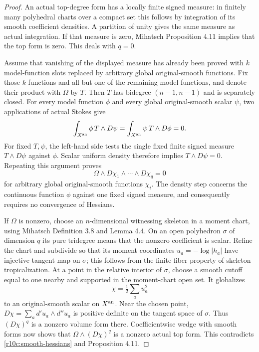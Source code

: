\begin{proof}
An actual top-degree form has a locally finite signed measure: in finitely
many polyhedral charts over a compact set this follows by integration of
its smooth coefficient densities.  A partition of unity gives the same
measure as actual integration.  If that measure is zero, Mihatsch
Proposition 4.11 implies that the top form is zero.  This deals with $q=0$.

Assume that vanishing of the displayed measure has already been proved
with $k$ model-function slots replaced by arbitrary global original-smooth
functions.  Fix those $k$ functions and all but one of the remaining
model functions, and denote their product with $\Omega$ by $T$.
Then $T$ has bidegree $(n-1,n-1)$ and is separately closed.  For every
model function $\phi$ and every global original-smooth scalar $\psi$,
two applications of actual Stokes give
\[
 \int_{X^{\rm an}}\phi\,T\wedge D\psi
     =\int_{X^{\rm an}}\psi\,T\wedge D\phi=0.
\]
For fixed $T,\psi$, the left-hand side tests the single fixed finite
signed measure $T\wedge D\psi$ against $\phi$.  Scalar uniform density
therefore implies $T\wedge D\psi=0$.  Repeating this argument proves
\[
          \Omega\wedge D\chi_1\wedge\cdots\wedge D\chi_q=0
\tag{D}\label{r10c:smooth-hessians}
\]
for arbitrary global original-smooth functions $\chi_i$.
The density step concerns the continuous function \(\phi\) against one fixed signed measure, and consequently requires no convergence of Hessians.

If $\Omega$ is nonzero, choose an $n$-dimensional witnessing skeleton
in a moment chart, using Mihatsch Definition 3.8 and Lemma 4.4.
On an open polyhedron $\sigma$ of dimension $q$ its pure tridegree
means that the nonzero coefficient is scalar.  Refine the chart and
subdivide so that its moment coordinates $u_a=-\log|h_a|$ have
injective tangent map on $\sigma$; this follows from the finite-fiber
property of skeleton tropicalization.  At a point in the relative
interior of $\sigma$, choose a smooth cutoff equal to one nearby and
supported in the moment-chart open set.  It globalizes
\[
                         \chi=\tfrac12\sum_a u_a^2
\]
to an original-smooth scalar on $X^{\rm an}$.  Near the chosen point,
$D\chi=\sum_a d'u_a\wedge d''u_a$ is positive definite on the tangent
space of $\sigma$.  Thus $(D\chi)^q$ is a nonzero volume form there.
Coefficientwise wedge with smooth forms now shows that
$\Omega\wedge(D\chi)^q$ is a nonzero actual top form.  This contradicts
\eqref{r10c:smooth-hessians} and Proposition 4.11.
\end{proof}

